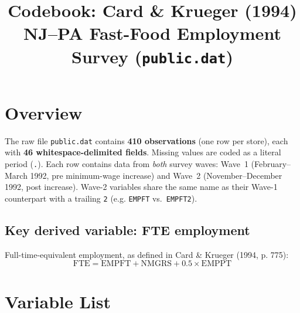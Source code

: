 \documentclass[11pt]{article}
\title{Codebook: Card \& Krueger (1994) \\ \large NJ--PA Fast-Food Employment Survey (\texttt{public.dat})}
\author{}
\date{}
\begin{document}
\maketitle

\section*{Overview}
The raw file \texttt{public.dat} contains \textbf{410 observations} (one row per store),
each with \textbf{46 whitespace-delimited fields}. Missing values are coded as a literal
period (\texttt{.}). Each row contains data from \emph{both} survey waves: Wave~1
(February--March 1992, pre minimum-wage increase) and Wave~2 (November--December 1992,
post increase). Wave-2 variables share the same name as their Wave-1 counterpart with a
trailing \texttt{2} (e.g. \texttt{EMPFT} vs.\ \texttt{EMPFT2}).

\subsection*{Key derived variable: FTE employment}
Full-time-equivalent employment, as defined in Card \& Krueger (1994, p. 775):
\[
\text{FTE} = \text{EMPFT} + \text{NMGRS} + 0.5 \times \text{EMPPT}
\]

\section*{Variable List}
\end{document}
